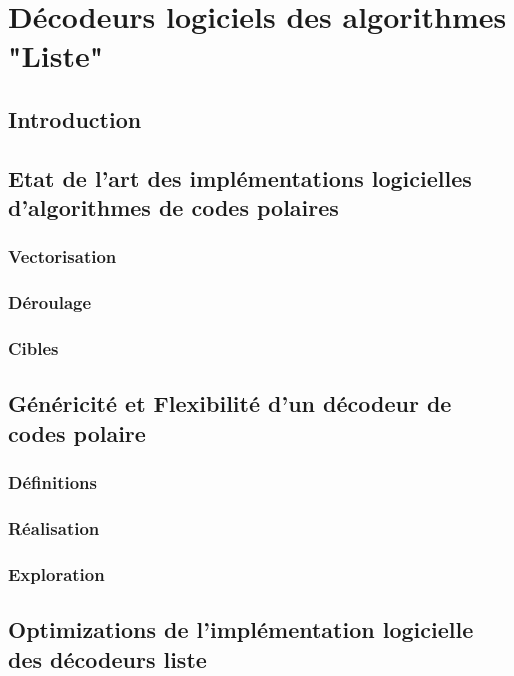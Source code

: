 \chapter{Décodeurs logiciels des algorithmes "Liste"} %


\vspace*{\fill}
\minitocTITI
\vspace*{\fill}
\newpage


\section*{Introduction}

\section{Etat de l'art des implémentations logicielles d'algorithmes de codes polaires}

\subsection{Vectorisation}
\subsection{Déroulage}
\subsection{Cibles}

\section{Généricité et Flexibilité d'un décodeur de codes polaire}

\subsection{Définitions}
\subsection{Réalisation}
\subsection{Exploration}

\section{Optimizations de l'implémentation logicielle des décodeurs liste}

